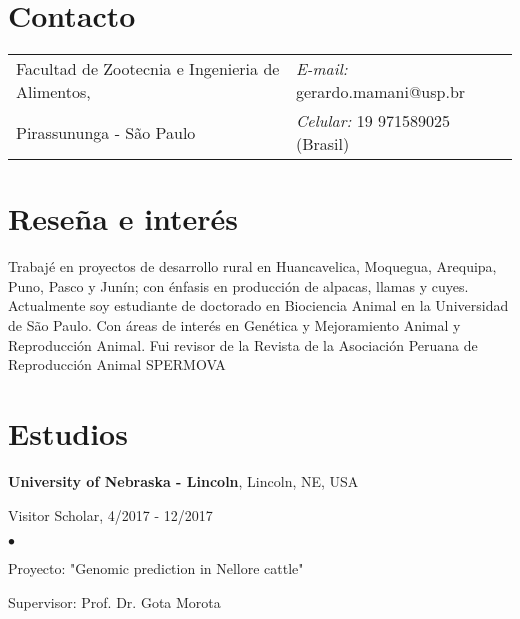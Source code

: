 \documentclass[margin,line,10pt]{res}
\newenvironment{list1}{
  \begin{list}{\ding{113}}{%
      \setlength{\itemsep}{0in}
      \setlength{\parsep}{0in} \setlength{\parskip}{0in}
      \setlength{\topsep}{0in} \setlength{\partopsep}{0in} 
      \setlength{\leftmargin}{0.17in}}}{\end{list}}
\newenvironment{list2}{
  \begin{list}{$\bullet$}{%
      \setlength{\itemsep}{0in}
      \setlength{\parsep}{0in} \setlength{\parskip}{0in}
      \setlength{\topsep}{0in} \setlength{\partopsep}{0in} 
      \setlength{\leftmargin}{0.2in}}}{\end{list}}
\begin{document}

\begin{resume}
\section{\sc Contacto}
\vspace{.05in}
\begin{tabular}{@{}p{3in}p{4in}}
Facultad de Zootecnia e Ingenieria de Alimentos,    & \hspace{2.3cm} {\it E-mail:}  gerardo.mamani@usp.br\\       
Pirassununga - São Paulo  & \hspace{2.3cm} {\it Celular:} 19 971589025 (Brasil)\\     

\end{tabular}

\vspace{0.3cm}
\section{\sc Reseña e interés}
Trabajé en proyectos de desarrollo rural en Huancavelica, Moquegua, Arequipa, Puno, Pasco y Junín; con énfasis en producción de alpacas, llamas y cuyes. Actualmente soy estudiante de doctorado en Biociencia Animal en la Universidad de São Paulo. Con áreas de interés en Genética y Mejoramiento Animal y Reproducción Animal. Fui revisor de la Revista de la Asociación Peruana de Reproducción Animal SPERMOVA
 
\section{\sc Estudios}

{\bf University of Nebraska - Lincoln}, Lincoln, NE, USA\\
\vspace*{-.1in}
\begin{list1}
\item[] Visitor Scholar, 4/2017 - 12/2017
\begin{list2}
\vspace*{.05in}
\item Proyecto: "Genomic prediction in Nellore cattle" 
\item Supervisor: Prof. Dr. Gota Morota
\end{list2}
\vspace*{.05in}
\end{list1}


\end{resume}
\end{document}
